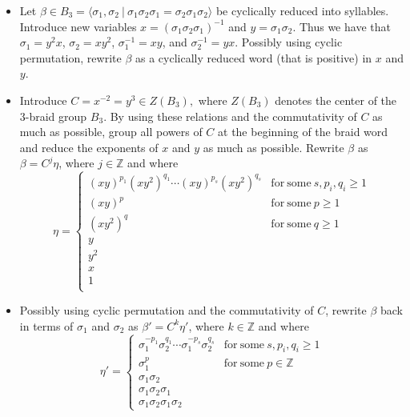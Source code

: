 \documentclass{article}
\begin{document}
\begin{itemize}
\item[(1)] Let $\beta \in B_{3}=\langle \sigma_{1}, \sigma_{2}\ \vert\ \sigma_{1}\sigma_{2}\sigma_{1}=\sigma_{2}\sigma_{1}\sigma_{2}\rangle$ be cyclically reduced into syllables. Introduce new variables $x=\left(\sigma_{1}\sigma_{2}\sigma_{1}\right)^{-1}$ and $y=\sigma_{1}\sigma_{2}$. Thus we have that $\sigma_{1}=y^2x$, $\sigma_{2}=xy^2$, $\sigma_{1}^{-1}=xy$, and $\sigma_{2}^{-1}=yx$. Possibly using cyclic permutation, rewrite $\beta$ as a cyclically reduced word (that is positive) in $x$ and $y$. 
\item[(2)] Introduce $C=x^{-2}=y^{3} \in Z(B_{3}),$ where $Z(B_{3})$ denotes the center of the 3-braid group $B_{3}$. By using these relations and the commutativity of $C$ as much as possible, group all powers of $C$ at the beginning of the braid word and reduce the exponents of $x$ and $y$ as much as possible. Rewrite $\beta$ as $\beta=C^{j}\eta$, where $j \in \mathbb{Z}$ and where
$$\eta = \left\{
\begin{array}{ll} 
\left(xy\right)^{p_{1}}\left(xy^2\right)^{q_{1}}\cdots \left(xy\right)^{p_{s}}\left(xy^2\right)^{q_{s}} & \mathrm{for\ some}\ s, p_{i}, q_{i} \geq 1 \\
\left(xy\right)^{p} & \mathrm{for\ some}\ p \geq 1 \\
\left(xy^{2}\right)^{q} & \mathrm{for\ some}\ q \geq 1 \\
y & \ \\
y^2 & \ \\
x & \ \\
1 & \ \\
\end{array}  \right.
$$
\item[(3)] Possibly using cyclic permutation and the commutativity of $C$, rewrite $\beta$ back in terms of $\sigma_{1}$ and $\sigma_{2}$ as $\beta'=C^{k}\eta'$, where $k \in \mathbb{Z}$ and where
$$ \eta' = \left\{
\begin{array}{ll} 
\sigma_{1}^{-p_{1}}\sigma_{2}^{q_{1}}\cdots \sigma_{1}^{-p_{s}}\sigma_{2}^{q_{s}} & \mathrm{for\ some}\ s, p_{i}, q_{i} \geq 1 \\
\sigma_{1}^{p} & \mathrm{for\ some}\ p\in \mathbb{Z} \\
\sigma_{1}\sigma_{2} & \ \\
\sigma_{1}\sigma_{2}\sigma_{1} & \ \\
\sigma_{1}\sigma_{2}\sigma_{1}\sigma_{2} & \ 
\end{array}  \right.
$$
\end{itemize}
\end{document}
